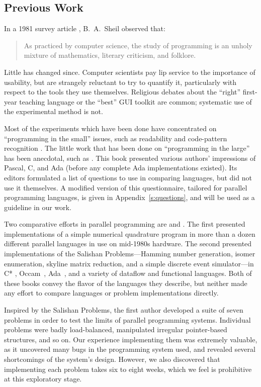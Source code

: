 \subsection{Previous Work\label{s:previous}}

In a 1981 survey article \cite{b:psych-prog-survey}, B.~A.\ Sheil observed that:
\begin{quote}
As practiced by computer science,
the study of programming is an unholy mixture of mathematics,
literary criticism,
and folklore.
\end{quote}
Little has changed since.
Computer scientists pay lip service to the importance of usability,
but are strangely reluctant to try to quantify it,
particularly with respect to the tools they use themselves.
Religious debates about the ``right'' first-year teaching language
or the ``best'' GUI toolkit are common;
systematic use of the experimental method is not.

Most of the experiments which have been done have concentrated on ``programming in the small'' issues,
such as readability and code-pattern recognition
\cite{b:reverse-parsing-2,b:cloze-program-1,b:prog-comprehension-1}.
The little work that has been done on ``programming in the large'' has been anecdotal,
such as \cite{b:compare-ada-c-pascal}.
This book presented various authors' impressions of Pascal, C, and Ada
(before any complete Ada implementations existed).
Its editors formulated a list of questions to use in comparing languages,
but did not use it themselves.
A modified version of this questionnaire,
tailored for parallel programming languages,
is given in Appendix~\ref{s:questions},
and will be used as a guideline in our work.

Two comparative efforts in parallel programming are \cite{b:babb-cases} and \cite{b:salishan}.
The first presented implementations of a simple numerical quadrature program
in more than a dozen different parallel languages
in use on mid-1980s hardware.
The second presented implementations of
the Salishan Problems---Hamming number generation,
isomer enumeration,
skyline matrix reduction,
and a simple discrete event simulator---in
C* \cite{b:dataparallel-c}, Occam~\cite{b:occam}, Ada~\cite{b:ada},
and a variety of dataflow and functional languages.
Both of these books convey the flavor of the languages they describe,
but neither made any effort to compare languages or problem implementations directly.

Inspired by the Salishan Problems,
the first author developed a suite of seven problems \cite{b:cowichan-1}
in order to test the limits of parallel programming systems.
Individual problems were badly load-balanced,
manipulated irregular pointer-based structures,
and so on.
Our experience implementing them was extremely valuable,
as it uncovered many bugs in the programming system used,
and revealed several shortcomings of the system's design.
However,
we also discovered that implementing each problem takes six to eight weeks,
which we feel is prohibitive at this exploratory stage.
